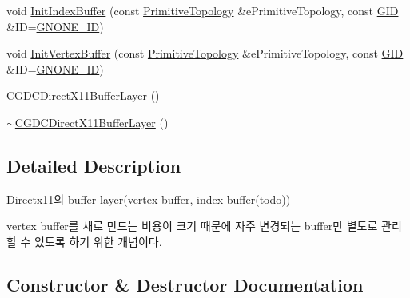\begin{DoxyCompactItemize}
\item 
void \hyperlink{class_c_g_d_c_direct_x11_buffer_layer_a1ee40609a5b44f7d709c44612f11858c}{Init\+Index\+Buffer} (const \hyperlink{_g_types_8h_a940e3da6a9b57aae3de0b050e2a7af5e}{Primitive\+Topology} \&e\+Primitive\+Topology, const \hyperlink{_g_types_8h_a5b96ecb16d8e437977d12cd40aa6f6d8}{G\+I\+D} \&I\+D=\hyperlink{_g_types_8h_a3d3e95c8557b67abe2ddd1726a2e4d9a}{G\+N\+O\+N\+E\+\_\+\+I\+D})
\item 
void \hyperlink{class_c_g_d_c_direct_x11_buffer_layer_a28f821793734fda0969f5362324835b1}{Init\+Vertex\+Buffer} (const \hyperlink{_g_types_8h_a940e3da6a9b57aae3de0b050e2a7af5e}{Primitive\+Topology} \&e\+Primitive\+Topology, const \hyperlink{_g_types_8h_a5b96ecb16d8e437977d12cd40aa6f6d8}{G\+I\+D} \&I\+D=\hyperlink{_g_types_8h_a3d3e95c8557b67abe2ddd1726a2e4d9a}{G\+N\+O\+N\+E\+\_\+\+I\+D})
\item 
\hyperlink{class_c_g_d_c_direct_x11_buffer_layer_a5dfb75c4c0ce70be3f1babc987447777}{C\+G\+D\+C\+Direct\+X11\+Buffer\+Layer} ()
\item 
\hyperlink{class_c_g_d_c_direct_x11_buffer_layer_a6bad3520b0c88925da9817b013548a06}{$\sim$\+C\+G\+D\+C\+Direct\+X11\+Buffer\+Layer} ()
\end{DoxyCompactItemize}


\subsection{Detailed Description}

\begin{DoxyItemize}
\item Directx11의 buffer layer(vertex buffer, index buffer(todo))
\item vertex buffer를 새로 만드는 비용이 크기 때문에 자주 변경되는 buffer만 별도로 관리할 수 있도록 하기 위한 개념이다. 
\end{DoxyItemize}

\subsection{Constructor \& Destructor Documentation}
\hypertarget{class_c_g_d_c_direct_x11_buffer_layer_a5dfb75c4c0ce70be3f1babc987447777}{}
